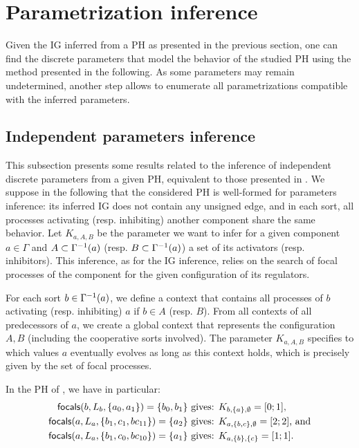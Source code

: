 \section{Parametrization inference}\label{sec:infer-K}

Given the IG inferred from a PH as presented in the previous section, one can find the discrete parameters that model the behavior of the studied PH using the method presented in the following.
As some parameters may remain undetermined, another step allows to enumerate all parametrizations compatible with the inferred parameters.

\subsection{Independent parameters inference}

This subsection presents some results related to the inference of independent discrete parameters from a given PH,
equivalent to those presented in \cite{PMR10-TCSB}.
We suppose in the following that the considered PH is well-formed for parameters inference: its inferred IG does not contain any unsigned edge,
and in each sort, all processes activating (resp. inhibiting) another component share the same behavior.
Let $K_{a,A,B}$ be the parameter we want to infer for a given component $a \in \Gamma$
and $A \subset \Gamma^{-1}(a)$ (resp. $B \subset \Gamma^{-1}(a)$) a set of its activators (resp. inhibitors).
This inference, as for the IG inference, relies on the search of focal processes of the component for the given configuration of its regulators.

For each sort $b \in \Gamma^{-1}(a)$, we define a context that contains all processes of $b$ activating (resp. inhibiting) $a$ if $b \in A$ (resp. $B$).
From all contexts of all predecessors of $a$, we create a global context that represents the configuration $A,B$ (including the cooperative sorts involved).
The parameter $K_{a,A,B}$ specifies to which values $a$ eventually evolves as long as this context holds, which is precisely given by the set of focal processes.

\begin{example*}
In the PH of , we have in particular:
\begin{align*}
\mathsf{focals}(b,L_b,\{a_0, a_1\}) = \{b_0, b_1\} &\text{ gives: } K_{b,\{a\},\emptyset} = [0 ; 1], \\
\mathsf{focals}(a,L_a,\{b_1, c_1, bc_{11}\}) = \{a_2\} &\text{ gives: } K_{a,\{b,c\},\emptyset} = [2 ; 2] \text{, and} \\
\mathsf{focals}(a,L_a,\{b_1, c_0, bc_{10}\}) = \{a_1\} &\text{ gives: } K_{a,\{b\},\{c\}} = [1;1].
\end{align*}
\end{example*}

